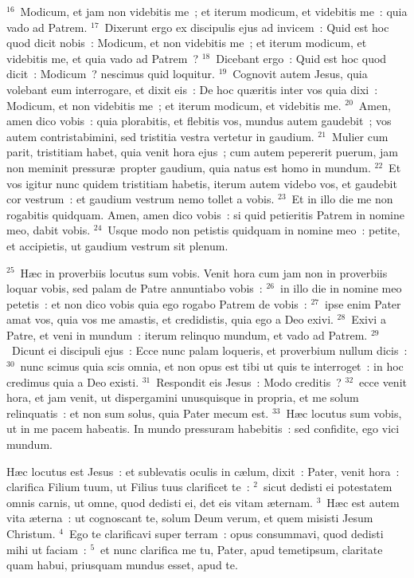 ${}^{16}$~Modicum, et jam non videbitis me~; et iterum modicum, et videbitis me~: quia vado ad Patrem.
${}^{17}$~Dixerunt ergo ex discipulis ejus ad invicem~: Quid est hoc quod dicit nobis~: Modicum, et non videbitis me~; et iterum modicum, et videbitis me, et quia vado ad Patrem~?
${}^{18}$~Dicebant ergo~: Quid est hoc quod dicit~: Modicum~? nescimus quid loquitur.
${}^{19}$~Cognovit autem Jesus, quia volebant eum interrogare, et dixit eis~: De hoc qu\ae ritis inter vos quia dixi~: Modicum, et non videbitis me~; et iterum modicum, et videbitis me.
${}^{20}$~Amen, amen dico vobis~: quia plorabitis, et flebitis vos, mundus autem gaudebit~; vos autem contristabimini, sed tristitia vestra vertetur in gaudium.
${}^{21}$~Mulier cum parit, tristitiam habet, quia venit hora ejus~; cum autem pepererit puerum, jam non meminit pressur\ae\ propter gaudium, quia natus est homo in mundum.
${}^{22}$~Et vos igitur nunc quidem tristitiam habetis, iterum autem videbo vos, et gaudebit cor vestrum~: et gaudium vestrum nemo tollet a vobis.
${}^{23}$~Et in illo die me non rogabitis quidquam. Amen, amen dico vobis~: si quid petieritis Patrem in nomine meo, dabit vobis.
${}^{24}$~Usque modo non petistis quidquam in nomine meo~: petite, et accipietis, ut gaudium vestrum sit plenum.


${}^{25}$~H\ae c in proverbiis locutus sum vobis. Venit hora cum jam non in proverbiis loquar vobis, sed palam de Patre annuntiabo vobis~:
${}^{26}$~in illo die in nomine meo petetis~: et non dico vobis quia ego rogabo Patrem de vobis~:
${}^{27}$~ipse enim Pater amat vos, quia vos me amastis, et credidistis, quia ego a Deo exivi.
${}^{28}$~Exivi a Patre, et veni in mundum~: iterum relinquo mundum, et vado ad Patrem.
${}^{29}$~Dicunt ei discipuli ejus~: Ecce nunc palam loqueris, et proverbium nullum dicis~:
${}^{30}$~nunc scimus quia scis omnia, et non opus est tibi ut quis te interroget~: in hoc credimus quia a Deo existi.
${}^{31}$~Respondit eis Jesus~: Modo creditis~?
${}^{32}$~ecce venit hora, et jam venit, ut dispergamini unusquisque in propria, et me solum relinquatis~: et non sum solus, quia Pater mecum est.
${}^{33}$~H\ae c locutus sum vobis, ut in me pacem habeatis. In mundo pressuram habebitis~: sed confidite, ego vici mundum.

\lettrine[lines=3,image=true,loversize=0.05,lraise=-0.03]{H}{}\ae c locutus est Jesus~: et sublevatis oculis in c\ae lum, dixit~: Pater, venit hora~: clarifica Filium tuum, ut Filius tuus clarificet te~:
${}^{2}$~sicut dedisti ei potestatem omnis carnis, ut omne, quod dedisti ei, det eis vitam \ae ternam.
${}^{3}$~H\ae c est autem vita \ae terna~: ut cognoscant te, solum Deum verum, et quem misisti Jesum Christum.
${}^{4}$~Ego te clarificavi super terram~: opus consummavi, quod dedisti mihi ut faciam~:
${}^{5}$~et nunc clarifica me tu, Pater, apud temetipsum, claritate quam habui, priusquam mundus esset, apud te.


